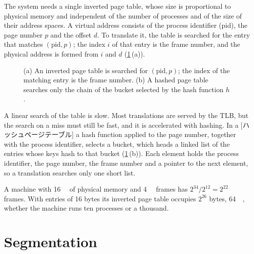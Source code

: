 \documentclass[../main.tex]{subfiles}
\begin{document}
The system needs a single inverted page table, whose size is proportional
to physical memory and independent of the number of processes and of the
size of their address spaces.  A virtual
address consists of the process identifier (pid), the page number $p$ and
the offset $d$.  To translate it, the table is searched for the entry that
matches $(\text{pid}, p)$; the index $i$ of that entry is the frame number,
and the physical address is formed from $i$ and $d$
(\cref{fig:l08-inverted}\,(a)).

\begin{figure}[htbp]
  \centering
  
  \caption{(a) An inverted page table is searched for $(\text{pid}, p)$;
    the index of the matching entry is the frame number.  (b) A hashed page
    table searches only the chain of the bucket selected by the hash
    function $h$.}
  \label{fig:l08-inverted}
\end{figure}

A linear search of the table is slow.  Most translations are served by the
TLB, but the search on a miss must still be fast, and it is accelerated
with hashing.  In a [ハッシュページテーブル] a hash
function applied to the page number, together with the process identifier,
selects a bucket, which heads a linked list of the entries whose keys hash
to that bucket (\cref{fig:l08-inverted}\,(b)).  Each element holds the
process identifier, the page number, the frame number and a pointer to the
next element, so a translation searches only one short list.

\begin{example}
  A machine with \SI{16}{\gibi\byte} of physical memory and
  \SI{4}{\kibi\byte} frames has $2^{34}/2^{12} = 2^{22}$ frames.  With
  entries of 16 bytes its inverted page table occupies $2^{26}$ bytes,
  \SI{64}{\mebi\byte}, whether the machine runs ten processes or a thousand.
\end{example}

\section{Segmentation}
\label{sec:l08-segmentation}
\end{document}
